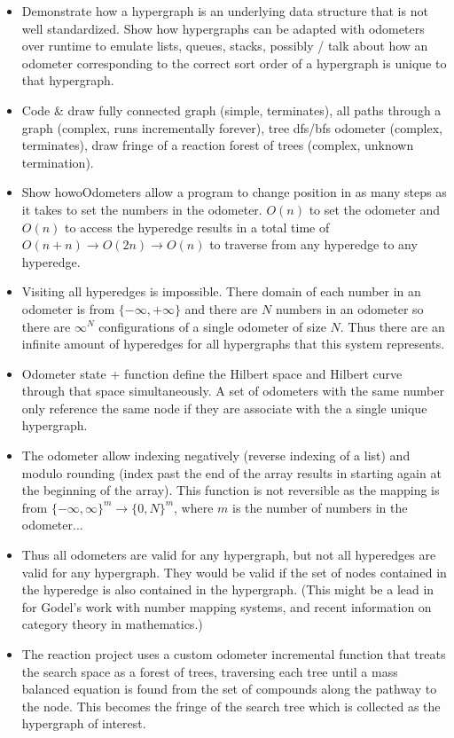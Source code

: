 \documentclass[12pt]{article}
\begin{document}
\begin{itemize}
	\item Demonstrate how a hypergraph is an underlying data structure that is not well standardized. Show how hypergraphs can be adapted with odometers over runtime to emulate lists, queues, stacks, possibly / talk about how an odometer corresponding to the correct sort order of a hypergraph is unique to that hypergraph.
	\item Code \& draw fully connected graph (simple, terminates), all paths through a graph (complex, runs incrementally forever), tree dfs/bfs odometer (complex, terminates),  draw fringe of a reaction forest of trees (complex, unknown termination).
	\item Show howoOdometers allow a program to change  position in as many steps as it takes to set the numbers in the odometer. $O(n)$ to set the odometer and $O(n)$ to access the hyperedge results in a total time of $O(n+n) \rightarrow O(2n) \rightarrow O(n)$ to traverse from any hyperedge to any hyperedge.
	\item Visiting all hyperedges is impossible. There domain of each number in an odometer is from $\{-\infty,+\infty\}$ and there are $N$ numbers in an odometer so there are $\infty^N$ configurations of a single odometer of size $N$. Thus there are an infinite amount of hyperedges for all hypergraphs that this system represents. 
	\item Odometer state + function define the Hilbert space and Hilbert curve through that space simultaneously. A set of odometers with the same number only reference the same node if they are associate with the a single unique hypergraph.
	\item The odometer allow indexing negatively (reverse indexing of a list) and modulo rounding (index past the end of the array results in starting again at the beginning of the array). This function is not reversible as the mapping is from $\{-\infty,\infty\}^m \rightarrow \{0,N\}^m$, where $m$ is the number of numbers in the odometer...
	\item Thus all odometers are valid for any hypergraph, but not all hyperedges are valid for any hypergraph. They would be valid if the set of nodes contained in the hyperedge is also contained in the hypergraph. (This might be a lead in for Godel's work with number mapping systems, and recent information on category theory in mathematics.)
	\item The reaction project uses a custom odometer incremental function that treats the search space as a forest of trees, traversing each tree until a mass balanced equation is found from the set of compounds along the pathway to the node. This becomes the fringe of the search tree which is collected as the hypergraph of interest. 
	
\end{itemize}
\end{document}
